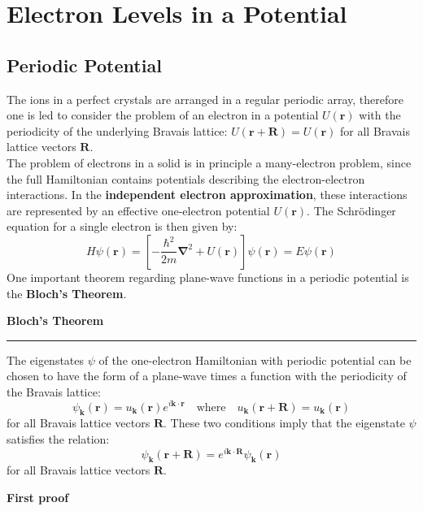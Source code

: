 \documentclass[10.75pt,a4paper,openright,bottom=2cm]{article}
\renewcommand{\Vec}[1]{\boldsymbol{#1}}
\begin{document}
\section{Electron Levels in a Potential}
\subsection{Periodic Potential}
The ions in a perfect crystals are arranged in a regular periodic array, therefore one is led to consider the problem of an electron in a potential $U(\Vec{r})$ with the periodicity of the underlying Bravais lattice: $U(\Vec{r}+\Vec{R})=U(\Vec{r})$ for all Bravais lattice vectors $\Vec{R}$.\\
The problem of electrons in a solid is in principle a many-electron problem, since the full Hamiltonian contains potentials describing the electron-electron interactions. In the \textbf{independent electron approximation}, these interactions are represented by an effective one-electron potential $U(\Vec{r})$. The Schr\"odinger equation for a single electron is then given by:
\[
H\psi(\Vec{r})=\left[-\frac{\hbar^2}{2m}\Vec{\nabla}^2+U(\Vec{r})\right]\psi(\Vec{r})=E\psi(\Vec{r})
\]
One important theorem regarding plane-wave functions in a periodic potential is the \textbf{Bloch's Theorem}.
\begin{mybox}
\textbf{Bloch's Theorem{\color{blue!30}{g}}}
\hrule
\vspace{0.25cm}
The eigenstates $\psi$ of the one-electron Hamiltonian with periodic potential can be chosen to have the form of a plane-wave times a function with the periodicity of the Bravais lattice:
\[
\psi_{\Vec{k}}(\Vec{r})=u_{\Vec{k}}(\Vec{r})e^{i\Vec{k}\cdot\Vec{r}} \quad \text{where} \quad u_{\Vec{k}}(\Vec{r}+\Vec{R})=u_{\Vec{k}}(\Vec{r})
\]
for all Bravais lattice vectors $\Vec{R}$. These two conditions imply that the eigenstate $\psi$ satisfies the relation:
\[
\psi_{\Vec{k}}(\Vec{r}+\Vec{R})=e^{i\Vec{k}\cdot\Vec{R}}\psi_{\Vec{k}}(\Vec{r})
\]
for all Bravais lattice vectors $\Vec{R}$.
\end{mybox}
\noindent
\textbf{First proof}
\end{document}
